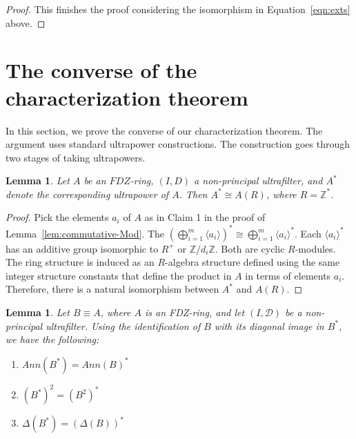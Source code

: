 \documentclass{article}
\newtheorem{lemma}[theorem]{Lemma}
\theoremstyle{remark}
\def\Z{{\mathbb{Z}}}
\def\D{{\mathcal{D}}}
\begin{document}
\begin{proof}
This finishes the proof considering the isomorphism in Equation~\ref{eqn:exts} above.
\end{proof}




\section{The converse of the characterization theorem}\label{sec:conv}
In this section, we prove the converse of our characterization theorem. The argument uses standard ultrapower constructions. The construction goes through two stages of taking ultrapowers.

\begin{lemma} Let $A$ be an $FDZ$-ring, $(I,D)$ a non-principal ultrafilter, and $A^*$ denote the corresponding ultrapower of $A$. Then $A^*\cong A(R)$, where $R=\Z^*$.\end{lemma}
\begin{proof} Pick the elements $a_i$ of $A$ as in Claim 1 in the proof of Lemma~\ref{lem:commutative-Mod}. The $(\bigoplus_{i=1}^m \langle a_i\rangle)^*\cong \bigoplus_{i=1}^m \langle a_i\rangle^*$. Each $\langle a_i\rangle^*$ has an additive group isomorphic to $R^+$ or $\Z/d_i\Z$. Both are cyclic $R$-modules. The ring structure is induced as an $R$-algebra structure defined using the same integer structure constants that define the product in $A$ in terms of elements $a_i$. Therefore, there is a natural isomorphism between $A^*$ and $A(R)$.\end{proof}
\begin{lemma} Let $B\equiv A$, where $A$ is an FDZ-ring, and let $(I,\D)$ be a non-principal ultrafilter. Using the identification of $B$ with its diagonal image in $B^*$, we have the following:
\begin{enumerate}
  \item[(a)] $Ann(B^*)=Ann(B)^*$
  \item[(b)] $(B^*)^2=(B^2)^*$
  \item[(c)] $\Delta(B^*)=(\Delta (B))^*$
\end{enumerate}
\end{lemma}
\end{document}
